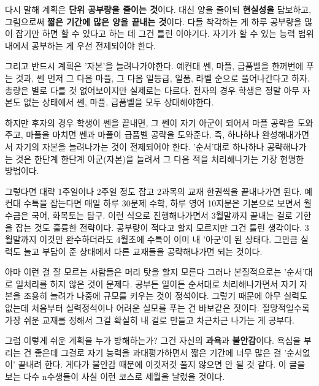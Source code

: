 다시 말해 계획은 \textbf{단위 공부량을 줄이는 것}이다.
대신 양을 줄이되 \textbf{현실성을} 담보하고, 그럼으로써 \textbf{짧은 기간에 많은 양을 끝내는 것}이다.
다들 착각하는 게 하루 공부량을 많이 잡기만 하면 할 수 있다고 하는 데 그건 틀린 이야기다.
자기가 할 수 있는 능력 범위 내에서 공부하는 게 우선 전제되어야 한다.
\vspace{5mm}

그리고 반드시 계획은 '자본'을 늘려나가야한다.
예컨대 쎈, 마플, 급품벨을 한꺼번에 푸는 것과, 쎈 먼저 그 다음 마플, 그 다음 일등급, 일품, 라벨 순으로 풀어나간다고 하자.
총량은 별로 다를 것 없어보이지만 실제로는 다르다.
전자의 경우 학생은 정말 아무 자본도 없는 상태에서 쎈, 마플, 급품벨을 모두 상대해야한다.
\vspace{5mm}

하지만 후자의 경우 학생이 쎈을 끝내면, 그 쎈이 자기 아군이 되어서 마플 공략을 도와주고, 마플을 마치면 쎈과 마플이 급품벨 공략을 도와준다.
즉, 하나하나 완성해내가면서 자기의 자본을 늘려나가는 것이 전제되어야 한다.
'순서'대로 하나하나 공략해나가는 것은 한단계 한단계 아군(자본)을 늘려서 그 다음 적을 처리해나가는 가장 현명한 방법이다.
\vspace{5mm}

그렇다면 대략 1주일이나 2주일 정도 잡고 2과목의 교재 한권씩을 끝내나가면 된다.
예컨대 수특을 잡는다면 매일 하루 30문제 수학, 하루 영어 10지문은 기본으로 보면서 월수금은 국어, 화목토는 탐구.
이런 식으로 진행해나가면서 3월말까지 끝내는 걸로 기한을 잡는 것도 훌륭한 전략이다.
공부량이 적다고 할지 모르지만 그건 틀린 생각이다. 3월말까지 이것만 완수하더라도 4월초에 수특이 이미 내 '아군'이 된 상태다.
그만큼 실력도 늘고 부담이 준 상태에서 다른 교재들을 공략해나가면 되는 것이다.
\vspace{5mm}

아마 이런 걸 잘 모르는 사람들은 머리 탓을 할지 모른다
그러나 본질적으로는 '순서'대로 일처리를 하지 않은 것이 문제다.
공부든 일이든 순서대로 처리해나가면서 자기 자본을 조용히 늘려가 나중에 규모를 키우는 것이 정석이다.
그렇기 때문에 아무 실력도 없는데 처음부터 실력정석이나 어려운 실모를 푸는 건 바보같은 짓이다.
절망적일수록 가장 쉬운 교재를 정해서 그걸 확실히 내 걸로 만들고 차근차근 나가는 게 공부다.
\vspace{5mm}

그럼 이렇게 쉬운 계획을 누가 방해하는가?
그건 자신의 \textbf{과욕}과 \textbf{불안감}이다.
욕심을 부리는 건 좋은데 그걸로 자기 능력을 과대평가하면서 짧은 기간에 너무 많은 걸 '순서없이' 끝내려 한다.
게다가 불안감 때문에 이것저것 풀지 않으면 안 될 것 같다.
이 글을 보는 다수 n수생들이 사실 이런 코스로 세월을 날렸을 것이다.
\vspace{5mm}

